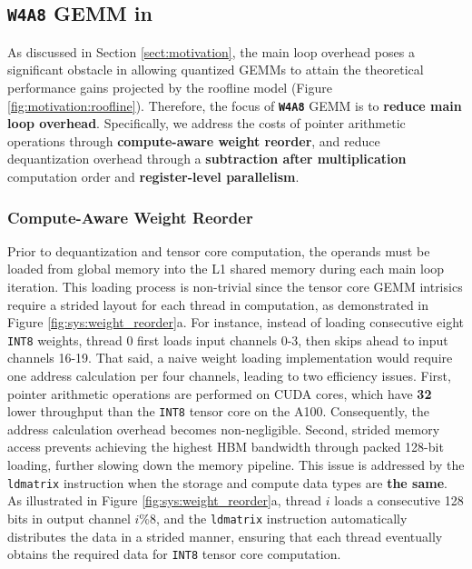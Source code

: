\subsection{\textbf{\texttt{W4A8}} GEMM in \system}

As discussed in Section \ref{sect:motivation}, the main loop overhead poses a significant obstacle in allowing quantized GEMMs to attain the theoretical performance gains projected by the roofline model (Figure \ref{fig:motivation:roofline}). Therefore, the focus of \system \textbf{\texttt{W4A8}} GEMM is to \textbf{reduce main loop overhead}. Specifically, we address the costs of pointer arithmetic operations through \textbf{compute-aware weight reorder}, and reduce dequantization overhead through a \textbf{subtraction after multiplication} computation order and \textbf{register-level parallelism}.

\subsubsection{Compute-Aware Weight Reorder}


Prior to dequantization and tensor core computation, the operands must be loaded from global memory into the L1 shared memory during each main loop iteration. This loading process is non-trivial since the tensor core GEMM intrisics require a strided layout for each thread in computation, as demonstrated in Figure \ref{fig:sys:weight_reorder}a. For instance, instead of loading consecutive eight \texttt{INT8} weights, thread 0 first loads input channels 0-3, then skips ahead to input channels 16-19. That said, a naive weight loading implementation would require one address calculation per four channels, leading to two efficiency issues. First, pointer arithmetic operations are performed on CUDA cores, which have \textbf{32\x} lower throughput than the \texttt{INT8} tensor core on the A100. Consequently, the address calculation overhead becomes non-negligible. Second, strided memory access prevents achieving the highest HBM bandwidth through packed 128-bit loading, further slowing down the memory pipeline. This issue is addressed by the \texttt{ldmatrix} instruction when the storage and compute data types are \textbf{the same}. As illustrated in Figure \ref{fig:sys:weight_reorder}a, thread $i$ loads a consecutive 128 bits in output channel $i \% 8$, and the \texttt{ldmatrix} instruction automatically distributes the data in a strided manner, ensuring that each thread eventually obtains the required data for \texttt{INT8} tensor core computation. 

